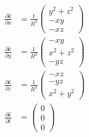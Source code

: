 
\begin{equation}
		\begin{aligned}
			\frac{\partial \mathbf{\hat{c}}}{\partial x} & =
			\frac{1}{ R^3 }
			\begin{pmatrix}
				y^2 + z^2 \\
				- x y     \\
				- x z
			\end{pmatrix}                                                  \\
			\frac{\partial \mathbf{\hat{c}}}{\partial y} & =
			\frac{1}{ R^3 }
			\begin{pmatrix}
				- x y    \\
				x^2 + z^2 \\
				- y z
			\end{pmatrix}                                                  \\
			\frac{\partial \mathbf{\hat{c}}}{\partial z} & = \frac{1}{ R^3}
			\begin{pmatrix}
				-  x z  \\
				-  y z \\
				x^2 + y^2
			\end{pmatrix}                                                  \\
			\frac{\partial \mathbf{\hat{c}}}{\partial t} & =
			\begin{pmatrix}
				0 \\
				0 \\
				0
			\end{pmatrix}
		\end{aligned}
\end{equation}

